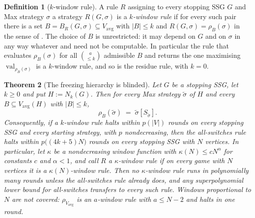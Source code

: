 \documentclass[11pt]{article}
\theoremstyle{plain}
\newtheorem{theorem}{Theorem}[section]
\theoremstyle{definition}
\newtheorem{definition}[theorem]{Definition}
\DeclareMathOperator{\val}{val}
\newcommand{\Vavg}{V_{\mathrm{avg}}}
\begin{document}
\begin{definition}[$k$-window rule]\label{def:window}
A rule $R$ assigning to every stopping SSG $G$ and Max strategy $\sigma$
a strategy $R(G,\sigma)$ is a \emph{$k$-window rule} if for every such
pair there is a set $B=B_R(G,\sigma)\subseteq\Vavg$ with $|B|\le k$ and
$R(G,\sigma)=\rho_B(\sigma)$ in the sense of . The
choice of $B$ is unrestricted: it may depend on $G$ and on $\sigma$ in
any way whatever and need not be computable. In particular the rule that
evaluates $\rho_B(\sigma)$ for all $\binom{a}{\le k}$ admissible $B$ and
returns the one maximising $\val_{\rho_B(\sigma)}$ is a $k$-window rule,
and so is the residue rule, with $k=0$.
\end{definition}

\begin{theorem}[The freezing hierarchy is blinded]\label{thm:window-barrier}
Let $G$ be a stopping SSG, let $k\ge0$ and put $H:=N_k(G)$. Then for
every Max strategy $\tilde\sigma$ of $H$ and every $B\subseteq\Vavg(H)$
with $|B|\le k$,
\[
  \rho_B(\tilde\sigma)\;=\;\tilde\sigma[S_{\tilde\sigma}].
\]
Consequently, if a $k$-window rule halts within $p(|V|)$ rounds on every
stopping SSG and every starting strategy, with $p$ nondecreasing, then
the all-switches rule halts within $p\bigl((4k+5)N\bigr)$ rounds on
every stopping SSG with $N$ vertices. In particular, let $\kappa$ be a
nondecreasing window function with $\kappa(N)\le cN^{\alpha}$ for
constants $c$ and $\alpha<1$, and call $R$ a $\kappa$-window rule if on
every game with $N$ vertices it is a $\kappa(N)$-window rule. Then no
$\kappa$-window rule runs in polynomially many rounds unless the
all-switches rule already does, and any superpolynomial lower bound for
all-switches transfers to every such rule. Windows proportional to $N$
are \emph{not} covered: $\rho_{\Vavg}$ is an $a$-window rule with
$a\le N-2$ and halts in one round.
\end{theorem}
\end{document}
